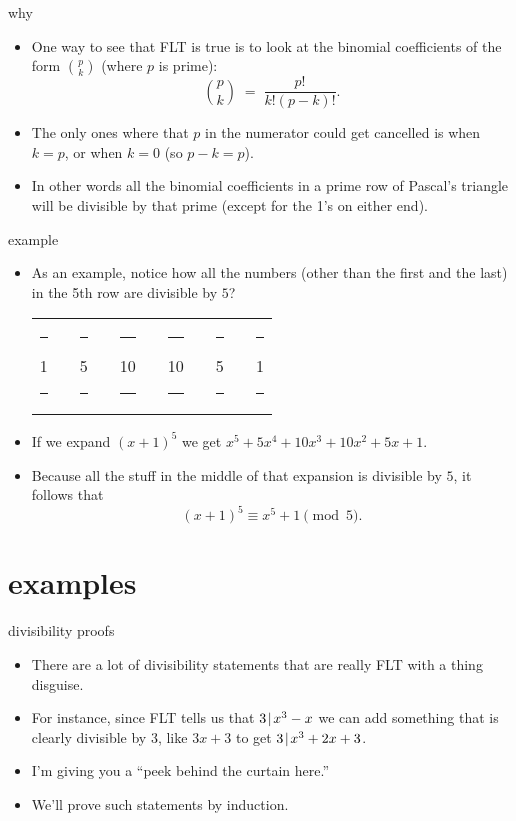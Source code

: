 \documentclass[handout,landscape]{beamer}
\begin{document}
\begin{frame}{why}
\begin{itemize}
\item One way to see that FLT is true is to look at the binomial coefficients of the form $\binom{p}{k}$ (where $p$ is prime):
\[ \binom{p}{k} \; = \; \frac{ p! }{k! (p-k)!} . \] \pause
\item The only ones where that $p$ in the numerator could get cancelled is when $k=p$, or when $k=0$ (so $p-k = p$). \pause
\item In other words all the binomial coefficients in a prime row of Pascal's triangle will be divisible by that prime (except for the 1's on either end). \pause
\end{itemize}

\end{frame}

\begin{frame}{example}
\begin{itemize}

\item As an example, notice how all the numbers (other than the first and the last) in the 5th row are divisible by $5$? \pause \newline

\begin{tabular}{ccccccccccc}
\rule{6pt}{0pt} 1 \rule{6pt}{0pt}& &\rule{6pt}{0pt} 5 \rule{6pt}{0pt}& & \rule{6pt}{0pt}10\rule{6pt}{0pt} & & \rule{6pt}{0pt}10 \rule{6pt}{0pt}& & \rule{6pt}{0pt}5\rule{6pt}{0pt} & & \rule{6pt}{0pt}1\rule{6pt}{0pt} \\
\end{tabular}
\pause

\vspace{.2in}

\item If we expand $(x+1)^5$ we get $x^5 + 5x^4 + 10x^3 + 10x^2 + 5x +1$. \pause
\item Because all the stuff in the middle of that expansion is divisible by $5$, it follows that
\[ (x+1)^5 \equiv x^5 + 1 \pmod{5}. \] 
\end{itemize}
\end{frame}

\section{examples}

\begin{frame}{divisibility proofs}
\begin{itemize}
\item There are a lot of divisibility statements that are really FLT with a thing disguise.
\item For instance, since FLT tells us that $3 \!\mid\! x^3 - x$ we can add something that is clearly divisible by 3, like $3x+3$ to get $3 \!\mid\! x^3 + 2x + 3$.\pause
\item I'm giving you a ``peek behind the curtain here.'' \pause
\item We'll prove such statements by induction.
\end{itemize}
\end{frame}
\end{document}
